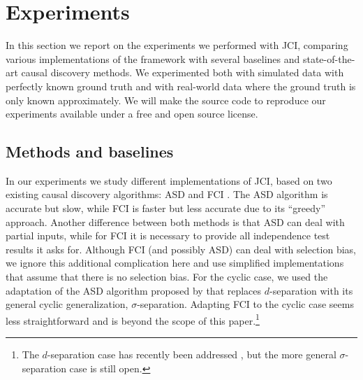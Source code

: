 \documentclass[twoside,11pt]{article}
\newcommand{\Joris}[1]{{\color{blue}#1}}
\newcommand{\Sara}[1]{{\color{purple}#1}}
\begin{document}

\section{Experiments}\label{sec:experiments}

In this section we report on the experiments we performed with JCI, comparing
various implementations of the framework with several baselines and
state-of-the-art causal discovery methods. We experimented both with simulated data
with perfectly known ground truth and with real-world data where the ground
truth is only known approximately. We will make the source code to reproduce
our experiments available under a free and open source license.

\subsection{Methods and baselines}

In our experiments we study different implementations of JCI, based on two 
existing causal discovery algorithms: ASD \citep{HEJ2014,MagliacaneClaassenMooij_NIPS_16,ForreMooij_UAI_18} and FCI \citep{SMR1999,Zhang2008_AI}.
The ASD algorithm is accurate but slow, while FCI is faster but less accurate 
due to its ``greedy'' approach. Another difference between both methods is that 
ASD can deal with partial inputs, while for FCI it is necessary to provide 
all independence test results it asks for. Although FCI (and possibly ASD)
can deal with selection bias, we ignore this additional complication here
and use simplified implementations that assume that there is no selection bias.
For the cyclic case, we used the adaptation of the ASD algorithm proposed by
\citet{ForreMooij_UAI_18} that replaces $d$-separation with
its general cyclic generalization, $\sigma$-separation. Adapting FCI to the cyclic case
seems less straightforward and is beyond the scope of this paper.\footnote{The 
$d$-separation case has recently been addressed \citep{Strobl2018}, but the
more general $\sigma$-separation case is still open.}
\end{document}
